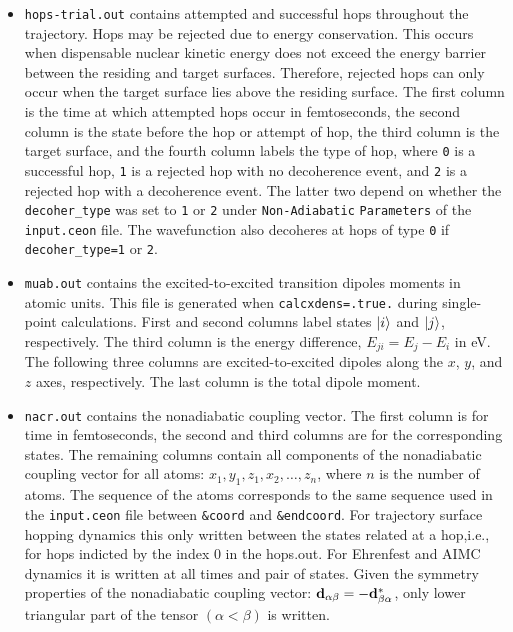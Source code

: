\begin{itemize}
\item \verb+hops-trial.out+ contains attempted and successful hops throughout the trajectory.  Hops may be rejected due to energy conservation.  This occurs when dispensable nuclear kinetic energy does not exceed the energy barrier between the residing and target surfaces.  Therefore, rejected hops can only occur when the target surface lies above the residing surface.  The first column is the time at which attempted hops occur in femtoseconds, the second column is the state before the hop or attempt of hop, the third column is the target surface, and the fourth column labels the type of hop, where \verb+0+ is a successful hop, \verb+1+ is a rejected hop with no decoherence event, and \verb+2+ is a rejected hop with a decoherence event.  The latter two depend on whether the \verb+decoher_type+ was set to \verb+1+ or \verb+2+ under \verb+Non-Adiabatic+ \verb+Parameters+ of the \verb+input.ceon+ file.  The wavefunction also decoheres at hops of type \verb+0+ if \verb+decoher_type=1+ or \verb+2+.
\item \verb+muab.out+ contains the excited-to-excited transition dipoles moments in atomic units.  This file is generated when \verb+calcxdens=.true.+ during single-point calculations.  First and second columns label states $\ket{i}$ and $\ket{j}$, respectively.  The third column is the energy difference, $E_{ji} = E_{j}-E_{i}$ in eV.  The following three columns are excited-to-excited dipoles along the $x$, $y$, and $z$ axes, respectively.  The last column is the total dipole moment.
\item \verb+nacr.out+ contains the nonadiabatic coupling vector. The first column is for time in femtoseconds, the second and third columns are for the corresponding states. The remaining columns contain all components of the nonadiabatic coupling vector for all atoms: $x_1, y_1, z_1, x_2, \hdots, z_n$, where $n$ is the number of atoms. The sequence of the atoms corresponds to the same sequence used in the \verb+input.ceon+ file between \verb+&coord+ and \verb+&endcoord+. For trajectory surface hopping dynamics this only written between the states related at a hop,i.e., for hops indicted by the index 0 in the hops.out. For Ehrenfest and AIMC dynamics it is written at all times and pair of states. Given the symmetry properties of the nonadiabatic coupling vector: ${\bf{d}}_{\alpha\beta}=-{\bf{d}}_{\beta\alpha}^{*}$, only lower triangular part of the tensor $(\alpha < \beta)$ is written.

\end{itemize}
